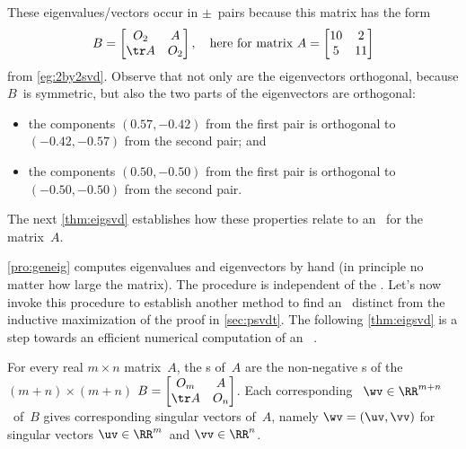 \begin{example}
\begin{solution}
These eigenvalues\slash vectors occur in \(\pm\)~pairs because this matrix has the form
\begin{equation*}
B=\begin{bmatrix} O_2& A\\ \tr A&O_2\end{bmatrix},
\quad\text{here for matrix }
A=\begin{bmatrix} 10&2\\5&11 \end{bmatrix}
\end{equation*}
from \autoref{eg:2by2svd}.
Observe that not only are the eigenvectors orthogonal, because \(B\)~is symmetric, but also the two parts of the eigenvectors are orthogonal:  
\begin{itemize}
\item the components \((0.57,-0.42)\) from the first pair is orthogonal to \((-0.42,-0.57)\) from the second pair; and 
\item the components \((0.50,-0.50)\) from the first pair is orthogonal to \((-0.50,-0.50)\) from the second pair.
\end{itemize}
The next \autoref{thm:eigsvd} establishes how these properties relate to an \svd\ for the matrix~\(A\).
\end{solution}
\end{example}


\autoref{pro:geneig} computes eigenvalues and eigenvectors by hand (in principle no matter how large the matrix). 
The procedure is independent of the \svd.
Let's now invoke this procedure to establish another method to find an \svd\ distinct from the inductive maximization of the proof in \autoref{sec:psvdt}. 
The following \autoref{thm:eigsvd} is a step towards an efficient numerical computation of an \svd\ \cite[p.234]{Trefethen1997}.



\begin{theorem} \label{thm:eigsvd}
For every real \(m\times n\) matrix~\(A\), the s of~\(A\) are the non-negative s of the \((m+n)\times(m+n)\)  \(B=\begin{bmatrix} O_m&A\\\tr A&O_n \end{bmatrix}\). 
Each corresponding ~\(\wv\in\RR^{m+n}\)\ of~\(B\) gives corresponding  singular vectors of~\(A\), namely \(\wv=(\uv,\vv)\) for singular vectors \(\uv\in\RR^m\)\ and \(\vv\in\RR^n\). 
\end{theorem}

